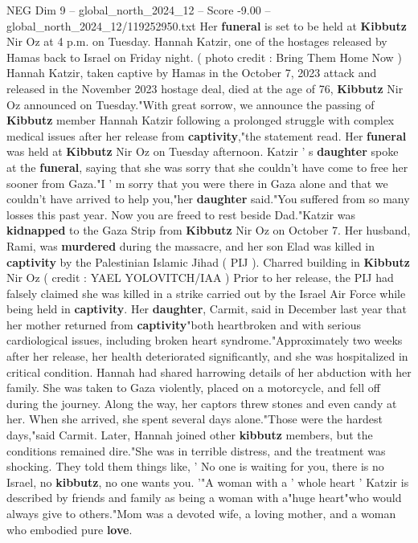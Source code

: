 \begin{textsample}{NEG Dim 9 – global\_north\_2024\_12 – Score -9.00 – global\_north\_2024\_12/119252950.txt}  \label{ex:f9_neg_112}
Her \textbf{funeral} is set to be held at \textbf{Kibbutz} Nir Oz at 4 p.m. on Tuesday.
Hannah Katzir, one of the hostages released by Hamas back to Israel on Friday night. ( photo credit : Bring Them Home Now ) Hannah Katzir, taken captive by Hamas in the October 7, 2023 attack and released in the November 2023 hostage deal, died at the age of 76, \textbf{Kibbutz} Nir Oz announced on Tuesday."With great sorrow, we announce the passing of \textbf{Kibbutz} member Hannah Katzir following a prolonged struggle with complex medical issues after her release from \textbf{captivity},"the statement read.
Her \textbf{funeral} was held at \textbf{Kibbutz} Nir Oz on Tuesday afternoon.
Katzir ' s \textbf{daughter} spoke at the \textbf{funeral}, saying that she was sorry that she couldn't have come to free her sooner from Gaza."I ' m sorry that you were there in Gaza alone and that we couldn't have arrived to help you,"her \textbf{daughter} said."You suffered from so many losses this past year.
Now you are freed to rest beside Dad."Katzir was \textbf{kidnapped} to the Gaza Strip from \textbf{Kibbutz} Nir Oz on October 7.
Her husband, Rami, was \textbf{murdered} during the massacre, and her son Elad was killed in \textbf{captivity} by the Palestinian Islamic Jihad ( PIJ ).
Charred building in \textbf{Kibbutz} Nir Oz ( credit : YAEL YOLOVITCH/IAA ) Prior to her release, the PIJ had falsely claimed she was killed in a strike carried out by the Israel Air Force while being held in \textbf{captivity}.
Her \textbf{daughter}, Carmit, said in December last year that her mother returned from \textbf{captivity}"both heartbroken and with serious cardiological issues, including broken heart syndrome."Approximately two weeks after her release, her health deteriorated significantly, and she was hospitalized in critical condition.
Hannah had shared harrowing details of her abduction with her family.
She was taken to Gaza violently, placed on a motorcycle, and fell off during the journey.
Along the way, her captors threw stones and even candy at her.
When she arrived, she spent several days alone."Those were the hardest days,"said Carmit.
Later, Hannah joined other \textbf{kibbutz} members, but the conditions remained dire."She was in terrible distress, and the treatment was shocking.
They told them things like, ' No one is waiting for you, there is no Israel, no \textbf{kibbutz}, no one wants you. '"A woman with a ' whole heart ' Katzir is described by friends and family as being a woman with a"huge heart"who would always give to others."Mom was a devoted wife, a loving mother, and a woman who embodied pure \textbf{love}.

\end{textsample}
